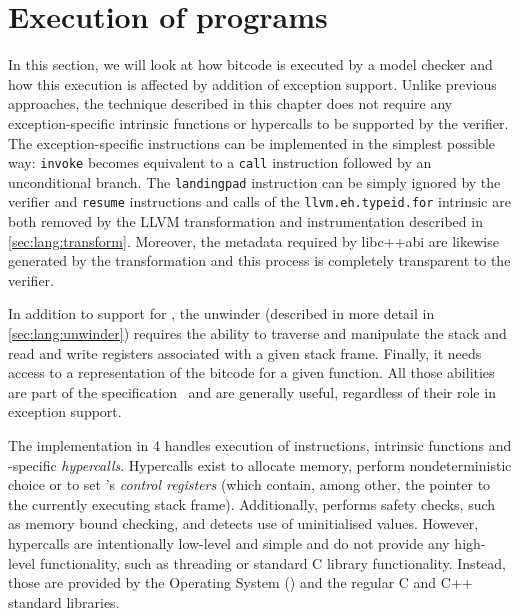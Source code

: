 \section{Execution of \llvm{} programs}\label{sec:execution}

In this section, we will look at how \llvm{} bitcode is executed by a model
checker and how this execution is affected by addition of exception
support. Unlike previous approaches, the technique described in this
chapter does not require any exception-specific intrinsic functions or
hypercalls to be supported by the verifier. The exception-specific \llvm{}
instructions can be implemented in the simplest possible way:
\texttt{invoke} becomes equivalent to a \texttt{call} instruction
followed by an unconditional branch. The \texttt{landingpad} instruction
can be simply ignored by the verifier and \texttt{resume} instructions
and calls of the \texttt{llvm.eh.typeid.for} intrinsic are both removed
by the LLVM transformation and instrumentation described in
\autoref{sec:lang:transform}.
Moreover, the metadata required by libc++abi are likewise
generated by the \llvm{} transformation and this process is completely
transparent to the verifier.

In addition to support for \llvm{}, the unwinder (described in more detail
in \autoref{sec:lang:unwinder}) requires the ability to traverse and
manipulate the stack and read and write \llvm{} registers associated with a
given stack frame. Finally, it needs access to a representation of the
bitcode for a given function. All those abilities are part of the \divm{}
specification~ and are generally useful, regardless
of their role in exception support.

The \divm{} implementation in \divine{} 4 handles execution of \llvm{}
instructions, \llvm{} intrinsic functions and \divm{}-specific
\emph{hypercalls}. Hypercalls exist to allocate memory,
perform nondeterministic choice or to set \divm{}'s \emph{control
registers} (which contain, among other, the pointer to the currently
executing stack frame). Additionally, \divm{} performs safety checks, such
as memory bound checking, and detects use of uninitialised values.
However, \divm{} hypercalls are intentionally low-level and simple and do
not provide any high-level functionality, such as threading or standard
C library functionality. Instead, those are provided by the \divine{}
Operating System (\dios{}) and the regular C and C++ standard libraries.


